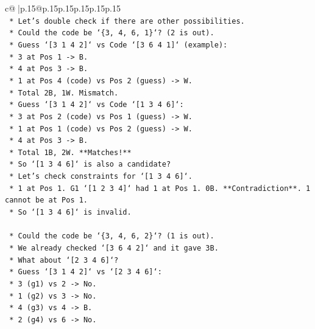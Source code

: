 \documentclass{article}
\begin{document}
{\begin{supertabular}{c@{$\;$}|p{.15\linewidth}@{}p{.15\linewidth}p{.15\linewidth}p{.15\linewidth}p{.15\linewidth}p{.15\linewidth}}
{{{\\ 
\texttt{    *   Let's double check if there are other possibilities.} \\
\texttt{        *   Could the code be `\{3, 4, 6, 1\}`? (2 is out).} \\
\texttt{            *   Guess `{[}3 1 4 2{]}` vs Code `{[}3 6 4 1{]}` (example):} \\
\texttt{                *   3 at Pos 1 {-}> B.} \\
\texttt{                *   4 at Pos 3 {-}> B.} \\
\texttt{                *   1 at Pos 4 (code) vs Pos 2 (guess) {-}> W.} \\
\texttt{                *   Total 2B, 1W. Mismatch.} \\
\texttt{            *   Guess `{[}3 1 4 2{]}` vs Code `{[}1 3 4 6{]}`:} \\
\texttt{                *   3 at Pos 2 (code) vs Pos 1 (guess) {-}> W.} \\
\texttt{                *   1 at Pos 1 (code) vs Pos 2 (guess) {-}> W.} \\
\texttt{                *   4 at Pos 3 {-}> B.} \\
\texttt{                *   Total 1B, 2W. **Matches!**} \\
\texttt{            *   So `{[}1 3 4 6{]}` is also a candidate?} \\
\texttt{                *   Let's check constraints for `{[}1 3 4 6{]}`.} \\
\texttt{                *   1 at Pos 1. G1 `{[}1 2 3 4{]}` had 1 at Pos 1. 0B. **Contradiction**. 1 cannot be at Pos 1.} \\
\texttt{            *   So `{[}1 3 4 6{]}` is invalid.} \\
\\ 
\texttt{        *   Could the code be `\{3, 4, 6, 2\}`? (1 is out).} \\
\texttt{            *   We already checked `{[}3 6 4 2{]}` and it gave 3B.} \\
\texttt{            *   What about `{[}2 3 4 6{]}`?} \\
\texttt{                *   Guess `{[}3 1 4 2{]}` vs `{[}2 3 4 6{]}`:} \\
\texttt{                    *   3 (g1) vs 2 {-}> No.} \\
\texttt{                    *   1 (g2) vs 3 {-}> No.} \\
\texttt{                    *   4 (g3) vs 4 {-}> B.} \\
\texttt{                    *   2 (g4) vs 6 {-}> No.} \\
}}}
\end{supertabular}}
\end{document}
